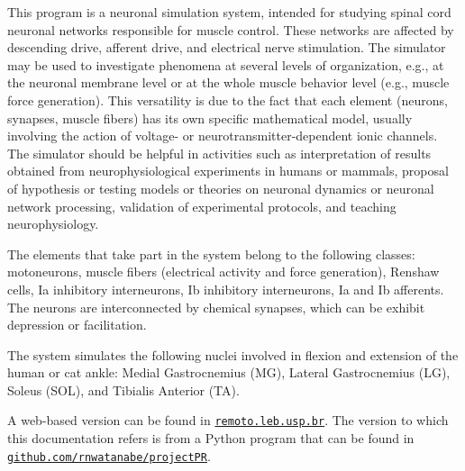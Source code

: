 This program is a neuronal simulation system, intended for studying spinal cord neuronal networks responsible for muscle control. These networks are affected by descending drive, afferent drive, and electrical nerve stimulation. The simulator may be used to investigate phenomena at several levels of organization, e.\+g., at the neuronal membrane level or at the whole muscle behavior level (e.\+g., muscle force generation). This versatility is due to the fact that each element (neurons, synapses, muscle fibers) has its own specific mathematical model, usually involving the action of voltage-\/ or neurotransmitter-\/dependent ionic channels. The simulator should be helpful in activities such as interpretation of results obtained from neurophysiological experiments in humans or mammals, proposal of hypothesis or testing models or theories on neuronal dynamics or neuronal network processing, validation of experimental protocols, and teaching neurophysiology.

The elements that take part in the system belong to the following classes\+: motoneurons, muscle fibers (electrical activity and force generation), Renshaw cells, Ia inhibitory interneurons, Ib inhibitory interneurons, Ia and Ib afferents. The neurons are interconnected by chemical synapses, which can be exhibit depression or facilitation.

The system simulates the following nuclei involved in flexion and extension of the human or cat ankle\+: Medial Gastrocnemius (MG), Lateral Gastrocnemius (LG), Soleus (S\+OL), and Tibialis Anterior (TA).

A web-\/based version can be found in \href{http://remoto.leb.usp.br/remoto/index.html}{\tt remoto.\+leb.\+usp.\+br}. The version to which this documentation refers is from a Python program that can be found in \href{https://github.com/rnwatanabe/projectPR}{\tt github.\+com/rnwatanabe/project\+PR}. 